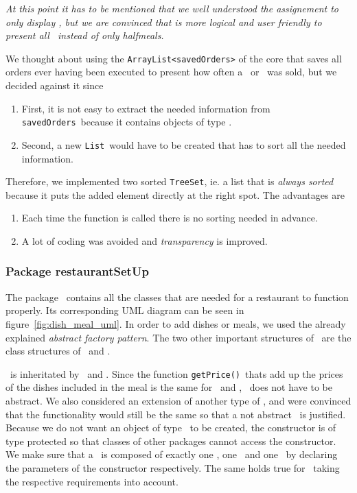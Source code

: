 \textit{At this point it has to be mentioned that we well understood the assignement
to only display \HalfMeal, but we are convinced that is more logical
and user friendly to present all \Meal~instead of only halfmeals.}

We thought about using the \lstinline|ArrayList<savedOrders>|
of the core that saves all orders ever having been executed 
to present how often a \Meal~or \Dish~was sold, but we decided against it since
\begin{enumerate}
	\item First, it is not easy to extract the needed information
  from \lstinline|savedOrders|~because it contains objects of type \Order.
	\item Second, a new \lstinline|List|~would have to be created
  that has to sort all the needed information.
\end{enumerate}
Therefore, we implemented two sorted \lstinline|TreeSet|, 
ie. a list that is \emph{always sorted} because it puts the added 
element directly at the right spot. 
The advantages are
\begin{enumerate}
	\item Each time the function is called there is no sorting needed in advance.
	\item A lot of coding was avoided and \emph{transparency} is improved.
\end{enumerate}


\subsubsection{Package restaurantSetUp} %
\label{ssub:restaurantsetup}

The package \restaurantSetup~contains all the classes that are needed
for a restaurant to function properly.
Its corresponding UML diagram can be seen in figure~\ref{fig:dish_meal_uml}.
In order to add dishes or meals, we used the already explained \emph{abstract
factory pattern}. The two other important structures of 
\restaurantSetup~are the class structures of \Meal~and \Dish. 

\Meal~is inheritated by \HalfMeal~and \FullMeal. Since the function \lstinline|getPrice()|~thats add up the prices of the dishes included in the meal is the same for \FullMeal~and \HalfMeal, \Meal~does not have to be abstract. We also considered an extension of another type of \Meal, and were convinced that the functionality would still be the same so that a not abstract \Meal~is justified.
Because we do not want an object of type \Meal~to be created, the constructor is of type protected so that classes of other packages cannot access the constructor. We make sure that a \FullMeal~is composed of exactly one \Starter, one \MainDish~and one \Dessert~by declaring the parameters of the constructor respectively. The same holds true for \HalfMeal~taking the respective requirements into account.

